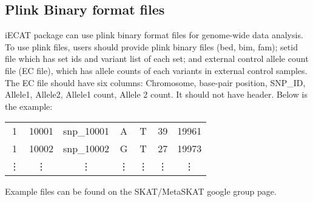 \documentclass{article}
\begin{document}
\subsection{Plink Binary format files}

iECAT package can use plink binary format files for genome-wide data analysis. 
To use plink files, users should provide plink binary files (bed, bim, fam); setid file which has set ids and variant list of each set; and external control allele count file (EC file), which has 
allele counts of each variants in external control samples. 
The EC file should have six columns: 
Chromosome, base-pair position, SNP_ID, Allele1, Allele2, Allele1 count, Allele 2 count. It should not have header. Below is the example: 

\begin{center}
\begin{tabular}{ccccccc}		
  1 &10001 &snp_10001 &A &T &39 &19961\\
1 &10002 &snp_10002 &G &T &27 &19973 \\
\vdots & \vdots &\vdots &\vdots &\vdots &\vdots &\vdots 
\end{tabular}
\end{center}

Example files can be found on the SKAT/MetaSKAT google group page.
\end{document}
